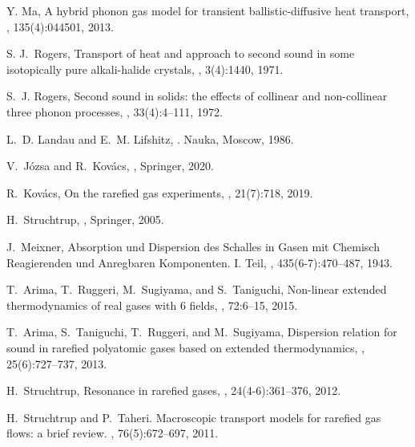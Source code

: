 \documentclass[sn-mathphys]{sn-jnl}%
\theoremstyle{thmstyleone}%
\theoremstyle{thmstyletwo}%
\theoremstyle{thmstylethree}%
\begin{document}
\begin{thebibliography}{9}
	Y. Ma,
	\newblock A hybrid phonon gas model for transient ballistic-diffusive heat
	transport,
	, 135(4):044501, 2013.
	
	
	S. J.~Rogers,
	\newblock Transport of heat and approach to second sound in some isotopically
	pure alkali-halide crystals,
	, 3(4):1440, 1971.
	
	S.~J. Rogers,
	\newblock Second sound in solids: the effects of collinear and non-collinear
	three phonon processes,
	, 33(4):4--111, 1972.
	
	L.~D. Landau and E.~M. Lifshitz,
	.
	\newblock Nauka, Moscow, 1986.
	
	V.~J\'ozsa and R.~Kov\'acs,
	,
	\newblock Springer, 2020.
	
	R.~Kov\'acs,
	\newblock On the rarefied gas experiments,
	, 21(7):718, 2019.
	
	H.~Struchtrup,
	,
	\newblock Springer, 2005.
	
	J.~Meixner,
	\newblock Absorption und {D}ispersion des {S}challes in {G}asen mit {C}hemisch
	{R}eagierenden und {A}nregbaren {K}omponenten. {I}. {T}eil,
	, 435(6-7):470--487, 1943.
	
	T.~Arima, T.~Ruggeri, M.~Sugiyama, and S.~Taniguchi,
	\newblock Non-linear extended thermodynamics of real gases with 6 fields,
	, 72:6--15, 2015.
	
	T.~Arima, S.~Taniguchi, T.~Ruggeri, and M.~Sugiyama,
	\newblock Dispersion relation for sound in rarefied polyatomic gases based on
	extended thermodynamics,
	, 25(6):727--737, 2013.
	
	H.~Struchtrup,
	\newblock Resonance in rarefied gases,
	, 24(4-6):361--376, 2012.
	
	H.~Struchtrup and P.~Taheri.
	\newblock Macroscopic transport models for rarefied gas flows: a brief review.
	, 76(5):672--697, 2011.
	

\end{thebibliography}
\end{document}
